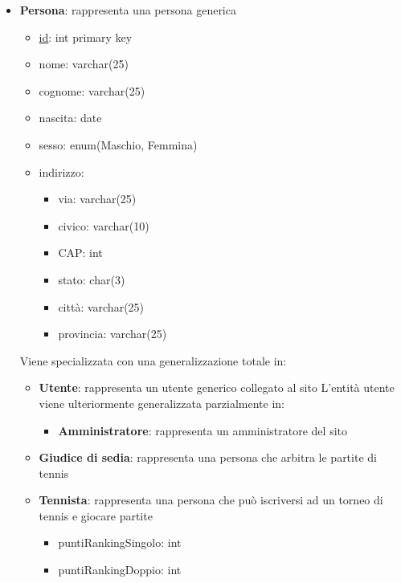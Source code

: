 \documentclass[10pt]{article}
\begin{document}
\begin{itemize}
    \item \textbf{Persona}: rappresenta una persona generica
    \begin{itemize}
        \item \underline{id}: int primary key
        \item nome: varchar(25)
        \item cognome: varchar(25)
        \item nascita: date
        \item sesso: enum(Maschio, Femmina)
        \item indirizzo:
        \begin{itemize}
            \item via: varchar(25)
            \item civico: varchar(10)
            \item CAP: int
            \item stato: char(3)
            \item città: varchar(25)
            \item provincia: varchar(25)
        \end{itemize}
    \end{itemize} 
    Viene specializzata con una generalizzazione totale in:
    \begin{itemize}
        \item \textbf{Utente}: rappresenta un utente generico collegato al sito\newline
        L'entità utente viene ulteriormente generalizzata parzialmente in:
        \begin{itemize}
            \item \textbf{Amministratore}: rappresenta un amministratore del sito
        \end{itemize}
        \item \textbf{Giudice di sedia}: rappresenta una persona che arbitra le partite di tennis
        \item \textbf{Tennista}: rappresenta una persona che può iscriversi ad un torneo di tennis e giocare partite
        \begin{itemize}
            \item puntiRankingSingolo: int
            \item puntiRankingDoppio: int
        \end{itemize}
        
    \end{itemize}
    

\end{itemize}
\end{document}
